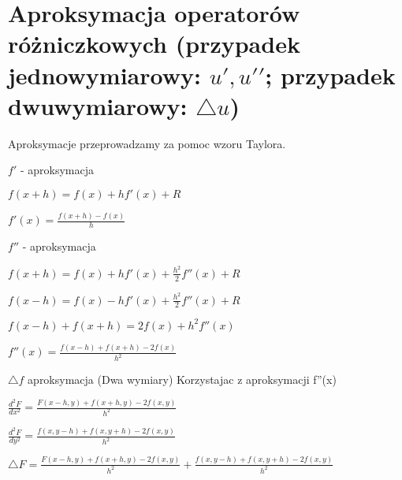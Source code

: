 \section{Aproksymacja operatorów różniczkowych (przypadek jednowymiarowy: ${u}', {{u}'}'$; przypadek dwuwymiarowy: $\bigtriangleup u$)}

Aproksymacje przeprowadzamy za pomoc wzoru Taylora. 

$f'$ - aproksymacja

$f(x+h) = f(x) + hf'(x) + R$

$f'(x) = \frac{f(x + h) - f(x)}{h}$

$f''$ - aproksymacja

$f(x+h) = f(x) + hf'(x) + \frac{h^2}{2}f''(x) + R$

$f(x-h) = f(x) - hf'(x) + \frac{h^2}{2}f''(x) + R$

$f(x-h) + f(x+h) = 2f(x) + h^2 f''(x)$

$f''(x) = \frac{f(x-h) + f(x+h) -2f(x)}{h^2} $

$\bigtriangleup f$ aproksymacja (Dwa wymiary)
Korzystajac z aproksymacji f''(x)

$\frac{d^2F}{dx^2} = \frac{F(x-h , y) + f(x+h,y) -2f(x,y)}{h^2} $

$\frac{d^2F}{dy^2} = \frac{f(x , y-h) + f(x, y+h) -2f(x,y)}{h^2} $

$\bigtriangleup F = \frac{F(x-h , y) + f(x+h,y) -2f(x,y)}{h^2} + \frac{f(x , y-h) + f(x, y+h) -2f(x,y)}{h^2}$